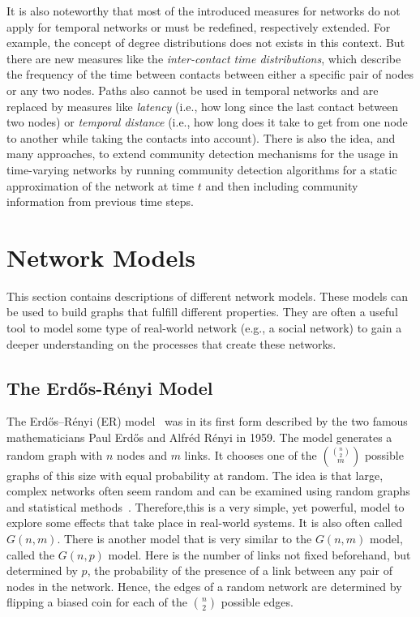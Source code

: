 It is also noteworthy that most of the introduced measures for networks do not apply for temporal networks or must be redefined, respectively extended.
For example, the concept of degree distributions does not exists in this context.
But there are new measures like the \emph{inter-contact time distributions}, which describe the frequency of the time between contacts between either a specific pair of nodes or any two nodes.
Paths also cannot be used in temporal networks and are replaced by measures like \emph{latency} (i.e., how long since the last contact between two nodes) or \emph{temporal distance} (i.e., how long does it take to get from one node to another while taking the contacts into account).
There is also the idea, and many approaches, to extend community detection mechanisms for the usage in time-varying networks by running community detection algorithms for a static approximation of the network at time \(t\) and then including community information from previous time steps.




\section{Network Models}
\label{sec:network-models}

This section contains descriptions of different network models.
These models can be used to build graphs that fulfill different properties.
They are often a useful tool to model some type of real-world network (e.g., a social network) to gain a deeper understanding on the processes that create these networks.

\subsection{The Erdős-Rényi Model}

The Erdős–Rényi (ER) model~\cite{Erdos1959, Newman2010} was in its first form described by the two famous mathematicians Paul Erdős and Alfréd Rényi in 1959.
The model generates a random graph with \(n\) nodes and \(m\) links.
It chooses one of the \(\binom{\binom{n}{2}}{m}\) possible graphs of this size with equal probability at random.
The idea is that large, complex networks often seem random and can be examined using random graphs and statistical methods~\cite{Barabasi2002}.
Therefore,this is a very simple, yet powerful, model to explore some effects that take place in real-world systems.
It is also often called \(G(n, m)\).
There is another model that is very similar to the \(G(n, m)\) model, called the \(G(n, p)\) model.
Here is the number of links not fixed beforehand, but determined by \(p\), the probability of the presence of a link between any pair of nodes in the network.
Hence, the edges of a random network are determined by flipping a biased coin for each of the \(\binom{n}{2}\) possible edges.

